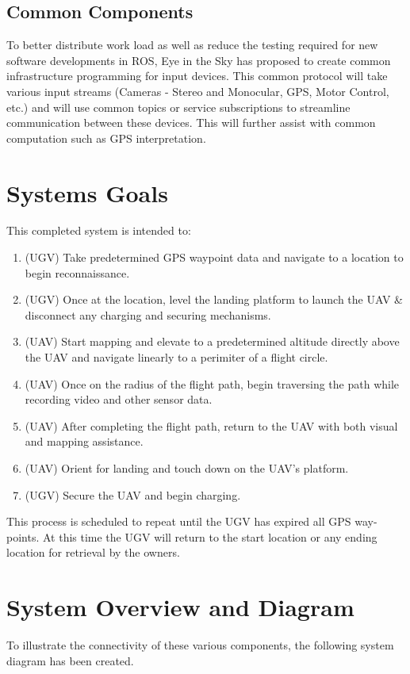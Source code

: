 \subsection{Common Components}
To better distribute work load as well as reduce the testing required for new software developments in ROS, Eye in the Sky has proposed to create common infrastructure programming for input devices.  This common protocol will take various input streams (Cameras - Stereo and Monocular, GPS, Motor Control, etc.) and will use common topics or service subscriptions to streamline communication between these devices.  This will further assist with common computation such as GPS interpretation.

\section{Systems Goals}
This completed system is intended to:\newline

  \begin{enumerate}

    \item (UGV) Take predetermined GPS waypoint data and navigate to a location to begin reconnaissance.
    \item (UGV) Once at the location, level the landing platform to launch the UAV \& disconnect any charging and securing mechanisms.
    \item (UAV) Start mapping and elevate to a predetermined altitude directly above the UAV and navigate linearly to a perimiter of a flight circle.
    \item (UAV) Once on the radius of the flight path, begin traversing the path while recording video and other sensor data.
    \item (UAV) After completing the flight path, return to the UAV with both visual and mapping assistance.
    \item (UAV) Orient for landing and touch down on the UAV's platform.
    \item (UGV) Secure the UAV and begin charging.

  \end{enumerate}

This process is scheduled to repeat until the UGV has expired all GPS way-points.  At this time the UGV will return to the start location or any ending location for retrieval by the owners.

\section{System Overview and Diagram}
To illustrate the connectivity of these various components, the following system diagram has been created.

